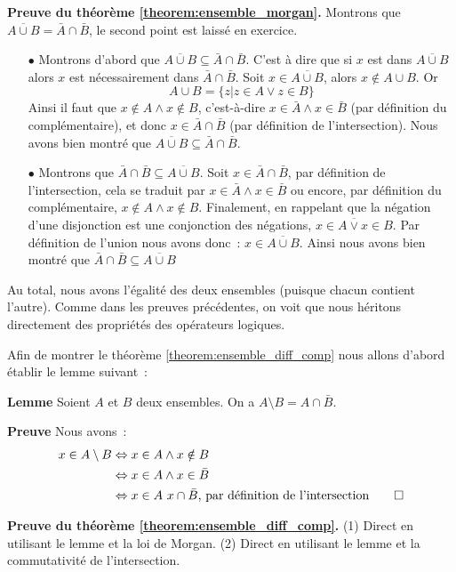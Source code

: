 \documentclass[10pt,notheorems]{beamer}
\theoremstyle{plain}
\theoremstyle{definition} %
\begin{document}
\begin{notes}

  \textbf{Preuve du théorème \hyperlink{slide_ensembles_morgan}{\ref{theorem:ensemble_morgan}}.} Montrons que $\overline{A\cup B} = \bar A \cap \bar B$, le second point est laissé en exercice.
  \begin{itemize}
  \item[$\bullet$] Montrons d'abord que $\overline{A\cup B} \subseteq \bar A \cap \bar B$. C'est à dire que si $x$ est dans $\overline{A\cup B}$ alors $x$ est nécessairement dans $\bar A \cap \bar B$. Soit $x\in\overline{A\cup B}$, alors $x\notin A\cup B$. Or
    \[
      A\cup B = \{z | z\in A \lor z\in B \}
    \]
    Ainsi il faut que $x\notin A \land x\notin B$, c'est-à-dire $x\in\bar A \land x\in\bar B$ (par définition du complémentaire), et donc $x\in \bar A \cap \bar B$ (par définition de l'intersection). Nous avons bien montré que $\overline{A\cup B} \subseteq \bar A \cap \bar B$.
  \item[$\bullet$] Montrons que $\bar A \cap \bar B \subseteq \overline{A\cup B}$. Soit $x\in \bar A \cap \bar B$, par définition de l'intersection, cela se traduit par $x\in \bar A \land x \in \bar B$ ou encore, par définition du complémentaire, $x\notin A \land x\notin B$. Finalement, en rappelant que la négation d'une disjonction est une conjonction des négations, $\overline{x\in A \lor x\in B}$. Par définition de l'union nous avons donc~: $x\in \overline{A\cup B}$. Ainsi nous avons bien montré que $\bar A \cap \bar B \subseteq \overline{A\cup B}$
  \end{itemize}
  Au total, nous avons l'égalité des deux ensembles (puisque chacun contient l'autre). Comme dans les preuves précédentes, on voit que nous héritons directement des propriétés des opérateurs logiques.

  \bigskip

  Afin de montrer le théorème \hyperlink{slide_ensembles_morgan}{\ref{theorem:ensemble_diff_comp}} nous allons d'abord établir le lemme suivant~:\newline

  \textbf{Lemme} Soient $A$ et $B$ deux ensembles. On a $A\setminus B = A \cap\bar B$.\newline

  \textbf{Preuve} Nous avons~:
  \[
    \begin{split}
      x\in A\setminus B &\Leftrightarrow x\in A \land x\notin B\\
      &\Leftrightarrow x\in A \land x\in \bar B\\
      &\Leftrightarrow x\in A \ x\cap \bar B \text{, par définition de l'intersection}\qed
    \end{split}
  \]

  \textbf{Preuve du théorème \hyperlink{slide_ensembles_morgan}{\ref{theorem:ensemble_diff_comp}}.} (1) Direct en utilisant le lemme et la loi de Morgan. (2) Direct en utilisant le lemme et la commutativité de l'intersection.

\end{notes}
\end{document}
